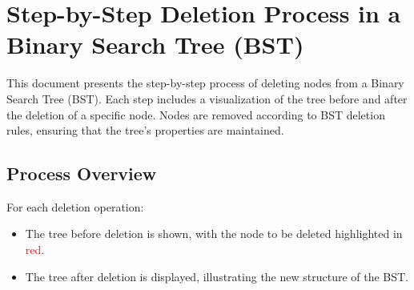 \documentclass[10pt,a4paper]{article}
\begin{document}
\section*{Step-by-Step Deletion Process in a Binary Search Tree (BST)}
This document presents the step-by-step process of deleting nodes from a Binary Search Tree (BST). Each step includes a visualization of the tree before and after the deletion of a specific node. Nodes are removed according to BST deletion rules, ensuring that the tree's properties are maintained.

\subsection*{Process Overview}
For each deletion operation:
\begin{itemize}
    \item The tree before deletion is shown, with the node to be deleted highlighted in \textcolor{red}{red}.
    \item The tree after deletion is displayed, illustrating the new structure of the BST.
\end{itemize}
\end{document}
